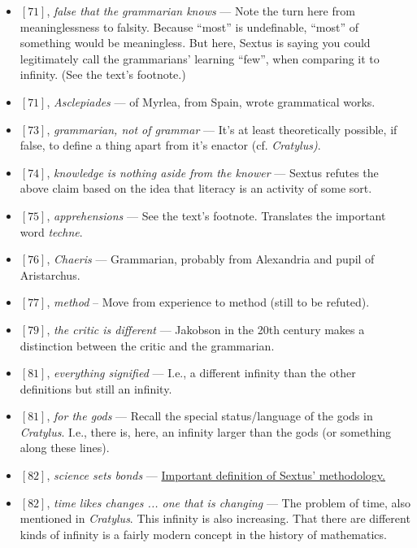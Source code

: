 \documentclass[12pt]{article}
\begin{document}
\begin{itemize}
\item $[71]$, \textit{false that the grammarian knows} --- Note the turn here from meaninglessness to falsity. Because ``most'' is undefinable, ``most'' of something would be meaningless. But here, Sextus is saying you could legitimately call the grammarians' learning ``few'', when comparing it to infinity. (See the text's footnote.)

\item $[71]$, \textit{Asclepiades} --- of Myrlea, from Spain, wrote grammatical works.

\item $[73]$, \textit{grammarian, not of grammar} --- It's at least theoretically possible, if false, to define a thing apart from it's enactor (cf. \textit{Cratylus)}.

\item $[74]$, \textit{knowledge is nothing aside from the knower} --- Sextus refutes the above claim based on the idea that literacy is an activity of some sort.

\item $[75]$, \textit{apprehensions} --- See the text's footnote. Translates the important word \textit{techne}.

\item $[76]$, \textit{Chaeris} --- Grammarian, probably from Alexandria and pupil of Aristarchus.

\item $[77]$, \textit{method} -- Move from experience to method (still to be refuted).

\item $[79]$, \textit{the critic is different} --- Jakobson in the 20th century makes a distinction between the critic and the grammarian.

\item $[81]$, \textit{everything signified} --- I.e., a different infinity than the other definitions but still an infinity.

\item $[81]$, \textit{for the gods} --- Recall the special status/language of the gods in \textit{Cratylus}. I.e., there is, here, an infinity larger than the gods (or something along these lines).

\item $[82]$, \textit{science sets bonds} --- \ul{Important definition of Sextus' methodology.}

\item $[82]$, \textit{time likes changes ... one that is changing} --- The problem of time, also mentioned in \textit{Cratylus}. This infinity is also increasing. That there are different kinds of infinity is a fairly modern concept in the history of mathematics.


\end{itemize}
\end{document}

